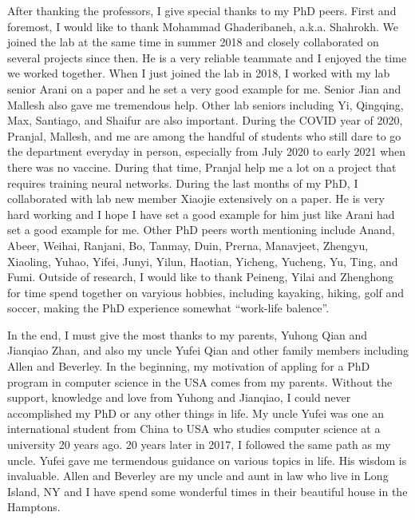 After thanking the professors, I give special thanks to my PhD peers. First and foremost, I would like to thank Mohammad Ghaderibaneh, a.k.a. Shahrokh.
We joined the lab at the same time in summer 2018 and closely collaborated on several projects since then. 
He is a very reliable teammate and I enjoyed the time we worked together.
When I just joined the lab in 2018, I worked with my lab senior Arani on a paper and he set a very good example for me. 
Senior Jian and Mallesh also gave me tremendous help. Other lab seniors including Yi, Qingqing, Max, Santiago, and Shaifur are also important.
During the COVID year of 2020, Pranjal, Mallesh, and me are among the handful of students who still dare to go the department everyday in person, 
especially from July 2020 to early 2021 when there was no vaccine. 
During that time, Pranjal help me a lot on a project that requires training neural networks.
During the last months of my PhD, I collaborated with lab new member Xiaojie extensively on a paper.
He is very hard working and I hope I have set a good example for him just like Arani had set a good example for me.
Other PhD peers worth mentioning include Anand, Abeer, Weihai, Ranjani, Bo, Tanmay, Duin, Prerna, Manavjeet, Zhengyu, Xiaoling, Yuhao, Yifei, Junyi, Yilun, Haotian, Yicheng, Yucheng, Yu, Ting, and Fumi.
Outside of research, I would like to thank Peineng, Yilai and Zhenghong for time spend together on varyious hobbies, including kayaking, hiking, golf and soccer, making the PhD experience somewhat ``work-life balence''.

In the end, I must give the most thanks to my parents, Yuhong Qian and Jianqiao Zhan, and also my uncle Yufei Qian 
and other family members including Allen and Beverley.
In the beginning, my motivation of appling for a PhD program in computer science in the USA comes from my parents.
Without the support, knowledge and love from Yuhong and Jianqiao, I could never accomplished my PhD or any other things in life.
My uncle Yufei was one an international student from China to USA who studies computer science at a university 20 years ago.
20 years later in 2017, I followed the same path as my uncle. 
Yufei gave me termendous guidance on various topics in life. His wisdom is invaluable.
Allen and Beverley are my uncle and aunt in law who live in Long Island, NY and I have spend some wonderful times in their beautiful house in the Hamptons.

